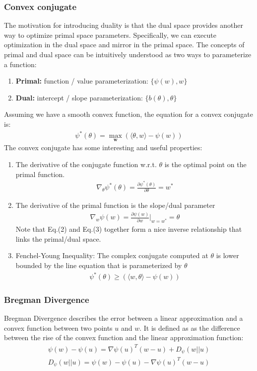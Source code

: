 \documentclass[11pt]{article}
\begin{document}
\subsubsection{Convex conjugate}
The motivation for introducing duality is that the dual space provides another way to optimize primal space parameters. Specifically, we can execute optimization in the dual space and mirror in the primal space. The concepts of primal and dual space can be intuitively understood as two ways to parameterize a function:
\begin{enumerate}
    \item \textbf{Primal:} function / value parameterization:
    $\{\psi(w), w\}$
    \item \textbf{Dual:} intercept / slope parameterization: 
    $\{b(\theta), \theta\}$
\end{enumerate}
Assuming we have a smooth convex function, the equation for a convex conjugate is:
\begin{align}
    \psi^*(\theta) = \max\limits_{\textbf{w}} (\langle \theta, w \rangle - \psi(w))
\end{align}
The convex conjugate has some interesting and useful properties:
\begin{enumerate}
    \item The derivative of the conjugate function w.r.t. $\theta$ is the optimal point on the primal function.
        \begin{align}
        \nabla_\theta \psi^*(\theta) = \frac{\partial \psi^*(\theta)}{\partial \theta} = w^*
        \end{align}
    \item The derivative of the primal function is the slope/dual parameter
        \begin{align}
        \nabla_w \psi(w) = \frac{\partial \psi(w)}{\partial w} |_{w=w^*} = \theta
        \end{align}
        Note that Eq.(2) and Eq.(3) together form a nice inverse relationship that links the primal/dual space.
    \item Fenchel-Young Inequality: The complex conjugate computed at $\theta$ is lower bounded by the line equation that is parameterized by $\theta$
        \begin{align}
        \psi^* (\theta) \geq (\langle w, \theta \rangle - \psi(w))
        \end{align}
\end{enumerate}

\subsubsection{Bregman Divergence}
Bregman Divergence describes the error between a linear approximation and a convex function between two points $u$ and $w$. It is defined as as the difference between the rise of the convex function and the linear approximation function:
\begin{align}
    \psi (w) - \psi (u) = \nabla \psi(u)^T (w-u) + D_{\psi}(w||u) \\ 
    D_{\psi}(w||u) = \psi(w) - \psi(u) - \nabla \psi(u)^T (w-u)
\end{align}
\end{document}
